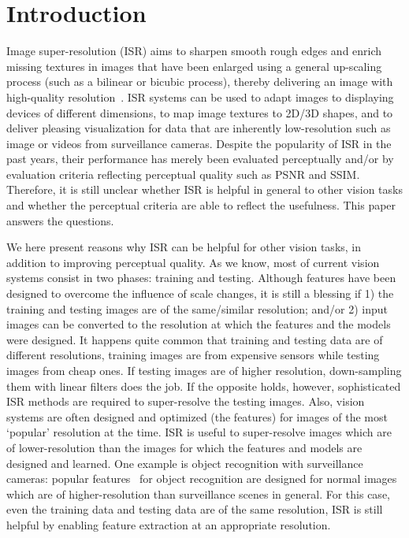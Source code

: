 \documentclass[10pt,twocolumn,letterpaper]{article}
\begin{document}

\section{Introduction}
\label{sec:intro}
Image super-resolution (ISR) aims to sharpen smooth rough edges and
enrich missing textures in images that have been enlarged using a
general up-scaling process (such as a bilinear or bicubic process),
thereby delivering an image with high-quality
resolution~\cite{Freeman-CGA-2002, Yang-TIP-2010, Zeyde-CS-2012,
  Timofte-ICCV-2013, Dong-ECCV-2014, JOR:EG15}. ISR systems can be
used to adapt images to displaying devices of different dimensions, to
map image textures to 2D/3D shapes, and to deliver pleasing
visualization for data that are inherently low-resolution such as
image or videos from surveillance cameras.  Despite the popularity of
ISR in the past years, their performance has merely been evaluated
perceptually and/or by evaluation criteria reflecting perceptual
quality such as PSNR and SSIM. Therefore, it is still unclear whether
ISR is helpful in general to other vision tasks and whether the
perceptual criteria are able to reflect the usefulness. 
This paper answers the questions.

We here present reasons why ISR can be helpful for other vision tasks,
in addition to improving perceptual quality. As we know, most of
current vision systems consist in two phases: training and
testing. Although features have been designed to overcome the
influence of scale changes, it is still a blessing if 1) the training
and testing images are of the same/similar resolution; and/or 2)
input images can be converted to the resolution at which the
features and the models were designed. It happens quite common that
training and testing data are of different resolutions, \eg training
images are from expensive sensors while testing images from cheap
ones. If testing images are of higher resolution, down-sampling them
with linear filters does the job. If the opposite holds, however,
sophisticated ISR methods are required to super-resolve the testing
images. Also, vision systems are often designed and optimized (\eg the
features) for images of the most `popular' resolution at the time. ISR
is useful to super-resolve images which are of lower-resolution than
the images for which the features and models are designed and
learned. One example is object recognition with surveillance cameras:
popular features~\cite{Lowe_SIFT, Dalal_HoG, cnnfeatureoffshelf} for object recognition are designed for normal images
which are of higher-resolution than surveillance scenes in
general. For this case, even the training data and testing data
are of the same resolution, ISR is still helpful by
enabling feature extraction at an appropriate resolution.
\end{document}
